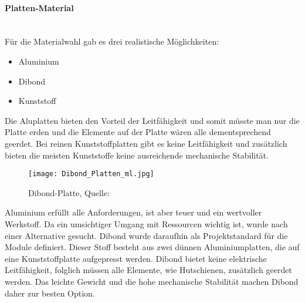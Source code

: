     \paragraph{Platten-Material}\mbox{}\\
    Für die Materialwahl gab es drei realistische Möglichkeiten: 
    \begin{itemize}
        \item Aluminium
        \item Dibond
        \item Kunststoff
    \end{itemize}
    Die Aluplatten bieten den Vorteil der Leitfähigkeit und somit müsste man nur die Platte erden und die Elemente auf der Platte wären alle dementsprechend geerdet. Bei reinen Kunststoffplatten gibt es keine Leitfähigkeit und zusätzlich bieten die meisten Kunststoffe keine ausreichende mechanische Stabilität.\\
    \begin{figure}[h]
        \centering
        \texttt{[image: Dibond\_Platten\_ml.jpg]}
        \caption{Dibond-Platte, Quelle: \cite{Dibond-Platte}}
        \label{fig:Sommerprototyp}
    \end{figure}
    Aluminium erfüllt alle Anforderungen, ist aber teuer und ein wertvoller Werkstoff. Da ein umsichtiger Umgang mit Ressourcen wichtig ist, wurde nach einer Alternative gesucht. Dibond wurde daraufhin als Projektstandard für die Module definiert. Dieser Stoff besteht aus zwei dünnen Aluminiumplatten, die auf eine Kunststoffplatte aufgepresst werden. Dibond bietet keine elektrische Leitfähigkeit, folglich müssen alle Elemente, wie Hutschienen, zusätzlich geerdet werden. Das leichte Gewicht und die hohe mechanische Stabilität machen Dibond daher zur besten Option.

